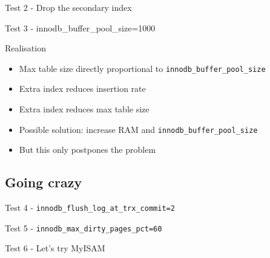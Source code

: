 \documentclass{beamer}
\begin{document}
\begin{frame}{Test 2 - Drop the secondary index}
\end{frame}

\begin{frame}{Test 3 - innodb\_buffer\_pool\_size=1000}
\end{frame}

\begin{frame}{Realisation}
  \begin{itemize}
  \item Max table size directly proportional to \texttt{innodb\_buffer\_pool\_size}
  \item Extra index reduces insertion rate
  \item Extra index reduces max table size
  \item<2-> Possible solution: increase RAM and \texttt{innodb\_buffer\_pool\_size}
  \item<2-> But this only postpones the problem
  \end{itemize}
\end{frame}

\subsection{Going crazy}

\begin{frame}{Test 4 - \texttt{innodb\_flush\_log\_at\_trx\_commit=2}}
\end{frame}

\begin{frame}{Test 5 - \texttt{innodb\_max\_dirty\_pages\_pct=60}}
\end{frame}

\begin{frame}{Test 6 - Let's try MyISAM}
\end{frame}
\end{document}
